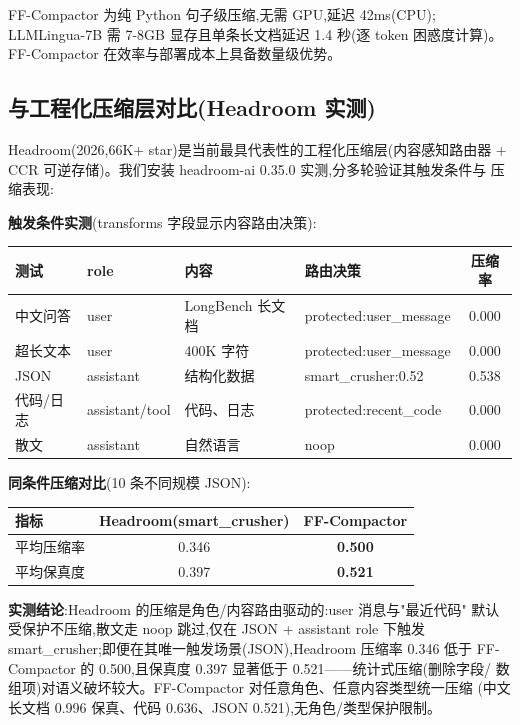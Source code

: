 \documentclass[11pt,a4paper]{article}
\begin{document}
FF-Compactor 为纯 Python 句子级压缩,无需 GPU,延迟 42ms(CPU);
LLMLingua-7B 需 7-8GB 显存且单条长文档延迟 1.4 秒(逐 token 困惑度计算)。
FF-Compactor 在效率与部署成本上具备数量级优势。

\subsection{与工程化压缩层对比(Headroom 实测)}

Headroom(2026,66K+ star)是当前最具代表性的工程化压缩层(内容感知路由器 +
CCR 可逆存储)。我们安装 headroom-ai 0.35.0 实测,分多轮验证其触发条件与
压缩表现:

\textbf{触发条件实测}(transforms 字段显示内容路由决策):

\begin{table}[h]
  \centering
  \begin{tabular}{@{}llllc@{}}
    \toprule
    测试 & role & 内容 & 路由决策 & 压缩率 \\
    \midrule
    中文问答 & user & LongBench 长文档 & protected:user\_message & 0.000 \\
    超长文本 & user & 400K 字符 & protected:user\_message & 0.000 \\
    JSON & assistant & 结构化数据 & smart\_crusher:0.52 & 0.538 \\
    代码/日志 & assistant/tool & 代码、日志 & protected:recent\_code & 0.000 \\
    散文 & assistant & 自然语言 & noop & 0.000 \\
    \bottomrule
  \end{tabular}
\end{table}

\textbf{同条件压缩对比}(10 条不同规模 JSON):

\begin{table}[h]
  \centering
  \begin{tabular}{@{}lcc@{}}
    \toprule
    指标 & Headroom(smart\_crusher) & FF-Compactor \\
    \midrule
    平均压缩率 & 0.346 & \textbf{0.500} \\
    平均保真度 & 0.397 & \textbf{0.521} \\
    \bottomrule
  \end{tabular}
\end{table}

\textbf{实测结论}:Headroom 的压缩是角色/内容路由驱动的:user 消息与"最近代码"
默认受保护不压缩,散文走 noop 跳过,仅在 JSON + assistant role 下触发
smart\_crusher;即便在其唯一触发场景(JSON),Headroom 压缩率 0.346 低于
FF-Compactor 的 0.500,且保真度 0.397 显著低于 0.521——统计式压缩(删除字段/
数组项)对语义破坏较大。FF-Compactor 对任意角色、任意内容类型统一压缩
(中文长文档 0.996 保真、代码 0.636、JSON 0.521),无角色/类型保护限制。
\end{document}
